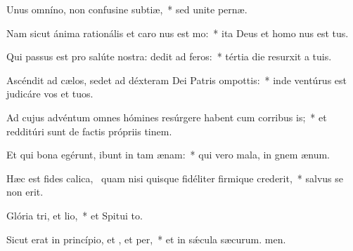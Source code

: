 \item Unus omníno, non confusine subtiæ,~* sed unite pernæ.
\item Nam sicut ánima rationális et caro nus est mo:~* ita Deus et homo nus est tus.
\item Qui passus est pro salúte nostra: dedit ad feros:~* tértia die resurxit a tuis.
\item Ascéndit ad cælos, sedet ad déxteram Dei Patris ompottis:~* inde ventúrus est judicáre vos et tuos.
\item Ad cujus advéntum omnes hómines resúrgere habent cum corribus is;~* et redditúri sunt de factis própriis tinem.
\item Et qui bona egérunt, ibunt in tam ænam:~* qui vero mala, in gnem ænum.
\item Hæc est fides calica,~\pscross{} quam nisi quisque fidéliter firmique crederit,~* salvus se non erit.
\item Glória tri, et lio,~* et Spitui to.
\item Sicut erat in princípio, et , et per,~* et in sǽcula sæcurum. men.
